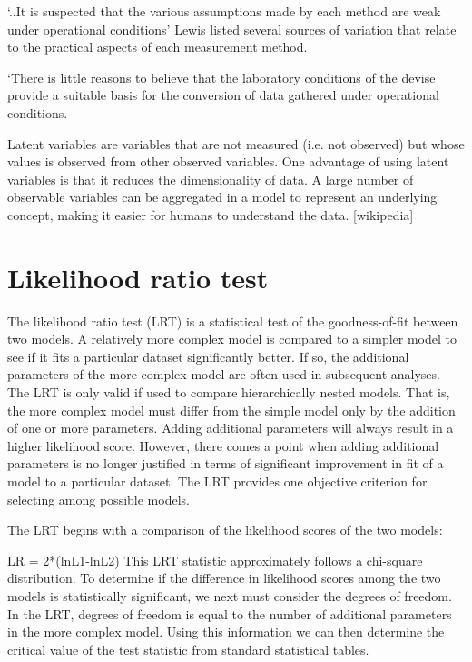 \documentclass[12pt, a4paper]{report}
\theoremstyle{plain}
\theoremstyle{definition}
\theoremstyle{remark}
\begin{document}
‘..It is suspected that the various assumptions made by each method are weak under operational conditions’
Lewis listed several sources of variation that relate to the practical aspects of each measurement method.

‘There is little reasons to believe that the laboratory conditions of the devise provide a suitable basis for the conversion of data gathered under operational conditions.


Latent variables are variables that are not measured (i.e. not observed) but whose values is observed from other observed variables. One advantage of using latent variables is that it reduces the dimensionality of data. A large number of observable variables can be aggregated in a model to represent an underlying concept, making it easier for humans to understand the data.	[wikipedia]

\section{Likelihood ratio test}



The likelihood ratio test (LRT) is a statistical test of the goodness-of-fit between two models. A relatively more complex model is compared to a simpler model to see if it fits a particular dataset significantly better. If so, the additional parameters of the more complex model are often used in subsequent analyses. The LRT is only valid if used to compare hierarchically nested models. That is, the more complex model must differ from the simple model only by the addition of one or more parameters. Adding additional parameters will always result in a higher likelihood score. However, there comes a point when adding additional parameters is no longer justified in terms of significant improvement in fit of a model to a particular dataset. The LRT provides one objective criterion for selecting among possible models.

The LRT begins with a comparison of the likelihood scores of the two models:

LR = 2*(lnL1-lnL2)
This LRT statistic approximately follows a chi-square distribution. To determine if the difference in likelihood scores among the two models is statistically significant, we next must consider the degrees of freedom. In the LRT, degrees of freedom is equal to the number of additional parameters in the more complex model. Using this information we can then determine the critical value of the test statistic from standard statistical tables.
\end{document}
